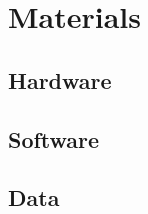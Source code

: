 \chapter{Materials}
\label{chap:materials}
\section*{Hardware}
\section*{Software}
\section*{Data}
\newpage